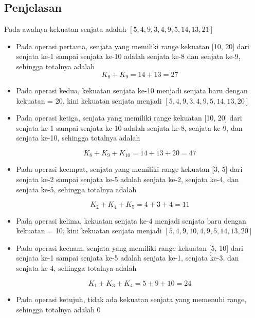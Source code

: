 \documentclass{article}
\begin{document}
\subsection*{Penjelasan}

Pada awalnya kekuatan senjata adalah $\left[5, 4, 9, 3, 4, 9, 5, 14, 13, 21\right]$

\begin{itemize}

\item Pada operasi pertama, senjata yang memiliki range kekuatan [10, 20] dari senjata ke-1 sampai senjata ke-10 adalah senjata ke-8 dan senjata ke-9, sehingga totalnya adalah $$K_8 + K_9 = 14 + 13 = 27$$
\item Pada operasi kedua, kekuatan senjata ke-10 menjadi senjata baru dengan kekuatan = 20, kini kekuatan senjata menjadi $\left[5, 4, 9, 3, 4, 9, 5, 14, 13, 20\right]$
\item Pada operasi ketiga, senjata yang memiliki range kekuatan [10, 20] dari senjata ke-1 sampai senjata ke-10 adalah senjata ke-8, senjata ke-9, dan senjata ke-10, sehingga totalnya adalah

$$K_8 + K_9 + K_{10} = 14 + 13 + 20 = 47$$

\item Pada operasi keempat, senjata yang memiliki range kekuatan [3, 5] dari senjata ke-2 sampai senjata ke-5 adalah senjata ke-2, senjata ke-4, dan senjata ke-5, sehingga totalnya adalah

$$K_2 + K_4 + K_5 = 4 + 3 + 4 = 11$$

\item Pada operasi kelima, kekuatan senjata ke-4 menjadi senjata baru dengan kekuatan = 10, kini kekuatan senjata menjadi $\left[5, 4, 9, 10, 4, 9, 5, 14, 13, 20\right]$
\item Pada operasi keenam, senjata yang memiliki range kekuatan [5, 10] dari senjata ke-1 sampai senjata ke-5 adalah senjata ke-1, senjata ke-3, dan senjata ke-4, sehingga totalnya adalah

$$K_1 + K_3 + K_4 = 5 + 9 + 10 = 24$$

\item Pada operasi ketujuh, tidak ada kekuatan senjata yang memenuhi range, sehingga totalnya adalah 0

\end{itemize}

\pagebreak
\end{document}
